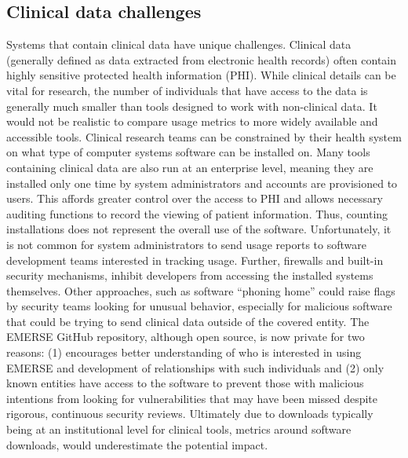 \documentclass{article}
\begin{document}
\subsection{Clinical data challenges}

Systems that contain clinical data have unique challenges.  Clinical data (generally defined as data extracted from electronic health records) often contain highly sensitive protected health information (PHI). While clinical details can be vital for research, the number of individuals that have access to the data is generally much smaller than tools designed to work with non-clinical data. It would not be realistic to compare usage metrics to more widely available and accessible tools. Clinical research teams can be constrained by their health system on what type of computer systems software can be installed on. Many tools containing clinical data are also run at an enterprise level, meaning they are installed only one time by system administrators and accounts are provisioned to users. This affords greater control over the access to PHI and allows necessary auditing functions to record the viewing of patient information.  Thus, counting installations does not represent the overall use of the software. Unfortunately, it is not common for system administrators to send usage reports to software development teams interested in tracking usage.  Further, firewalls and built-in security mechanisms, inhibit developers from accessing the installed systems themselves. Other approaches, such as software “phoning home” could raise flags by security teams looking for unusual behavior, especially for malicious software that could be trying to send clinical data outside of the covered entity. The EMERSE \cite{hanauer_supporting_2015} GitHub repository, although open source, is now private for two reasons: (1) encourages  better understanding of who is interested in using EMERSE and development of relationships with such individuals and (2)  only known entities have access to the software to prevent those with malicious intentions from looking for vulnerabilities that may have been missed despite rigorous, continuous security reviews.  Ultimately due to downloads typically being at an institutional level for clinical tools, metrics around software downloads, would underestimate the potential impact.  
\end{document}
